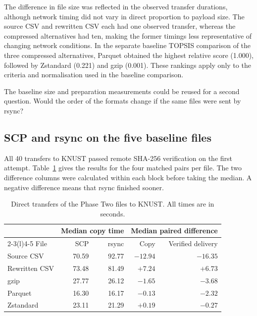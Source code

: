 The difference in file size was reflected in the observed transfer
durations, although network timing did not vary in direct proportion to
payload size. The source CSV and rewritten CSV each had one observed
transfer, whereas the compressed alternatives had ten, making the former
timings less representative of changing network conditions. In the
separate baseline TOPSIS comparison of the three compressed
alternatives, Parquet obtained the highest relative score (1.000),
followed by Zstandard (0.221) and gzip (0.001). These rankings apply
only to the criteria and normalisation used in the baseline comparison.

\noindent The baseline size and preparation measurements could be reused for a second question. Would the order of the formats change if the same files were sent by rsync?

\subsection{SCP and rsync on the five baseline files}
\noindent All 40 transfers to KNUST passed remote SHA-256 verification on the first attempt. Table~\ref{tab:phase2-paired} gives the results for the four matched pairs per file. The two difference columns were calculated within each block before taking the median. A negative difference means that rsync finished sooner.

\begin{table}[htbp]
\centering
\caption{Direct transfers of the Phase Two files to KNUST. All times are in seconds.}\label{tab:phase2-paired}
\begin{tabular}{@{}lrrrr@{}}
\toprule
 & \multicolumn{2}{c}{Median copy time} & \multicolumn{2}{c}{Median paired difference} \\
\cmidrule(lr){2-3}\cmidrule(l){4-5}
File & SCP & rsync & Copy & Verified delivery \\
\midrule
Source CSV    & 70.59 & 92.77 & $-12.94$ & $-16.35$ \\
Rewritten CSV & 73.48 & 81.49 & $+7.24$  & $+6.73$ \\
gzip          & 27.77 & 26.12 & $-1.65$  & $-3.68$ \\
Parquet       & 16.30 & 16.17 & $-0.13$  & $-2.32$ \\
Zstandard     & 23.11 & 21.29 & $+0.19$  & $-0.27$ \\
\bottomrule
\end{tabular}
\end{table}

